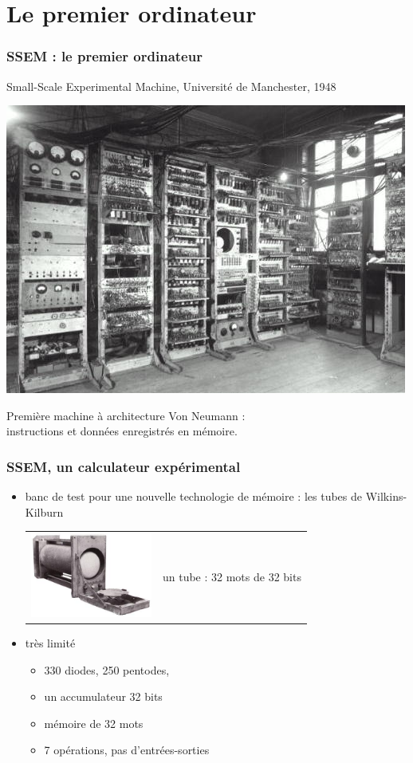 \section{Le premier ordinateur}
\begin{frame}
\frametitle{SSEM : le premier ordinateur}

\alert{Small-Scale Experimental Machine}, Université de Manchester, 1948

\begin{center}
\includegraphics[width=0.6\linewidth]{images/ssem01-2.jpg}
\end{center}
Première machine à \alert{architecture Von Neumann} : \\
\alert{instructions et données} enregistrés {en mémoire}.
\end{frame}

\begin{frame}
\frametitle{SSEM, un calculateur expérimental}
\begin{itemize}
\item \alert{banc de test} pour une nouvelle technologie de mémoire :
  les tubes de Wilkins-Kilburn
\begin{tabular}{lc}
\includegraphics[width=4cm]{images/Williams-tube.jpg} &
 un tube :  32 mots de 32 bits
\end{tabular}
\item \alert{très limité}
\begin{itemize}
\item 330 diodes, 250 pentodes, 
\item un accumulateur 32 bits
\item mémoire de 32 mots
\item 7 opérations, pas d'entrées-sorties
\end{itemize}
\end{itemize}
\end{frame}



